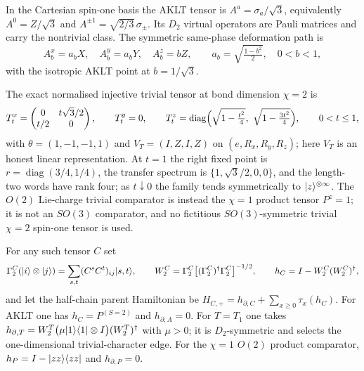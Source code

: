 \begin{definition}\label{def:comparison-tensors}
In the Cartesian spin-one basis the AKLT tensor is $A^{a}=\sigma_a/\sqrt3$,
equivalently $A^{0}=Z/\sqrt3$ and $A^{\pm1}=\sqrt{2/3}\,\sigma_{\pm}$. Its
$D_2$ virtual operators are Pauli matrices and carry the nontrivial class. The
symmetric same-phase deformation path is
\begin{equation}
  A_b^{x}=a_b X,\quad A_b^{y}=a_b Y,\quad A_b^{z}=b Z,
  \qquad a_b=\sqrt{\tfrac{1-b^{2}}{2}},\quad 0<b<1,
  \label{eq:spt-aklt-path}
\end{equation}
with the isotropic AKLT point at $b=1/\sqrt3$.

The exact normalised injective trivial tensor at bond dimension $\chi=2$ is
\begin{equation}
  T_t^{x}=\begin{pmatrix}0 & t\sqrt3/2\\ t/2 & 0\end{pmatrix},
  \qquad T_t^{y}=0,
  \qquad T_t^{z}=\operatorname{diag}\Bigl(
     \sqrt{1-\tfrac{t^{2}}{4}},\ \sqrt{1-\tfrac{3t^{2}}{4}}\Bigr),
  \qquad 0<t\le1,
  \label{eq:spt-triv-tensor}
\end{equation}
with $\theta=(1,-1,-1,1)$ and $V_T=(I,Z,I,Z)$ on $(e,R_x,R_y,R_z)$; here $V_T$
is an honest linear representation. At $t=1$ the right fixed point is
$r=\operatorname{diag}(3/4,1/4)$, the transfer spectrum is
$\{1,\sqrt3/2,0,0\}$, and the length-two words have rank four; as $t\downarrow0$
the family tends symmetrically to $|z\rangle^{\otimes\infty}$. The $O(2)$
Lie-charge trivial comparator is instead the $\chi=1$ product tensor $P^{z}=1$;
it is not an $SO(3)$ comparator, and no fictitious $SO(3)$-symmetric trivial
$\chi=2$ spin-one tensor is used.

For any such tensor $C$ set
\begin{equation}
  \Gamma_2^{C}(|i\rangle\otimes|j\rangle)=\sum_{s,t}(C^{s}C^{t})_{ij}|s,t\rangle,
  \qquad
  W_2^{C}=\Gamma_2^{C}\bigl[(\Gamma_2^{C})^{\dagger}\Gamma_2^{C}\bigr]^{-1/2},
  \qquad
  h_C=I-W_2^{C}(W_2^{C})^{\dagger},
  \label{eq:spt-parent-terms}
\end{equation}
and let the half-chain parent Hamiltonian be
$H_{C,+}=h_{\partial,C}+\sum_{x\ge0}\tau_x(h_C)$. For AKLT one has
$h_C=P^{(S=2)}$ and $h_{\partial,A}=0$. For $T=T_1$ one takes
$h_{\partial,T}=W_2^{T}\bigl(\mu|1\rangle\langle 1|\otimes I\bigr)(W_2^{T})^{\dagger}$
with $\mu>0$; it is $D_2$-symmetric and selects the one-dimensional
trivial-character edge. For the $\chi=1$ $O(2)$ product comparator,
$h_P=I-|zz\rangle\langle zz|$ and $h_{\partial,P}=0$.


\end{definition}

